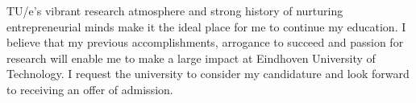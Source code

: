 \documentclass[11pt, a4paper]{awesome-cv}
\begin{document}
\begin{cvletter}
TU/e's vibrant research atmosphere and strong history of nurturing entrepreneurial minds make it the ideal place for me to continue my education. I believe that my previous accomplishments, arrogance to succeed and passion for research will enable me to make a large impact at Eindhoven University of Technology. I request the university to consider my candidature and look forward to receiving an offer of admission.
\end{cvletter}

\makeletterclosing
\end{document}
